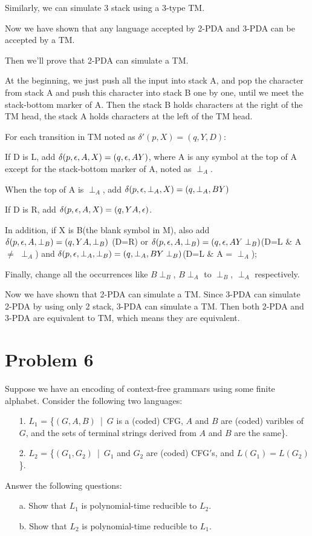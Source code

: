 \documentclass[a4paper,UTF8]{ctexart}
\theoremstyle{definition}
\begin{document}
Similarly, we can simulate 3 stack using a 3-type TM.

Now we have shown that any language accepted by 2-PDA and 3-PDA can be accepted by a TM.

Then we'll prove that 2-PDA can simulate a TM.

At the beginning,
we just push all the input into stack A, and pop the character from stack A and push this character into stack B
one by one, until we meet the stack-bottom marker of A. Then the stack B holds characters at the right 
of the TM head, the stack A holds characters at the left of the TM head.

For each transition in TM noted as $\delta'(p,X)=(q,Y,D)$: 

If D is L, add $\delta(p,\epsilon, A, X)=(q,\epsilon,AY)$, where A is any symbol at the top of A except 
for the stack-bottom marker of A, noted as $\perp_A$.

When the top of A is $\perp_A$, add $\delta(p,\epsilon,\perp_A, X)=(q,\perp_A,BY)$

If D is R, add $\delta(p,\epsilon, A, X)=(q,YA,\epsilon)$.

In addition, if X is B(the blank symbol in M), also add $\delta(p,\epsilon, A, \perp_B)=(q,YA,\perp_B)$ (D=R)
or $\delta(p,\epsilon,A, \perp_B)=(q,\epsilon,AY\perp_B)$(D=L \& A $\neq$ $\perp_A$) and 
$\delta(p,\epsilon,\perp_A, \perp_B)=(q,\perp_A,BY\perp_B)$(D=L \& A = $\perp_A$); 

Finally, change all the occurrences like $B\perp_B$, $B\perp_A$ to $\perp_B$, $\perp_A$ respectively.

Now we have shown that 2-PDA can simulate a TM. Since 3-PDA can simulate 2-PDA by using only 2 stack,
3-PDA can simulate a TM. Then both 2-PDA and 3-PDA are equivalent to TM, which means they are equivalent.



\section*{Problem 6}
Suppose we have an encoding of context-free grammars using some finite alphabet. Consider the following two languages:
\begin{enumerate}
  \item[1.] $L_1$ = \big\{$(G,A,B)$\ |\ $G$ is a (coded) CFG, $A$ and $B$ are (coded) varibles of $G$, and the sets of terminal strings derived from $A$ and $B$ are the same\big\}.
  \item[2.] $L_2$ = \big\{$(G_1,G_2)$\ |\ $G_1$ and $G_2$ are (coded) CFG$'$s, and $L(G_1) = L(G_2)$\big\}.
\end{enumerate}
Answer the following questions:
\begin{enumerate}
  \item[a.] Show that $L_1$ is polynomial-time reducible to $L_2$.
  \item[b.] Show that $L_2$ is polynomial-time reducible to $L_1$.
\end{enumerate}
\end{document}
